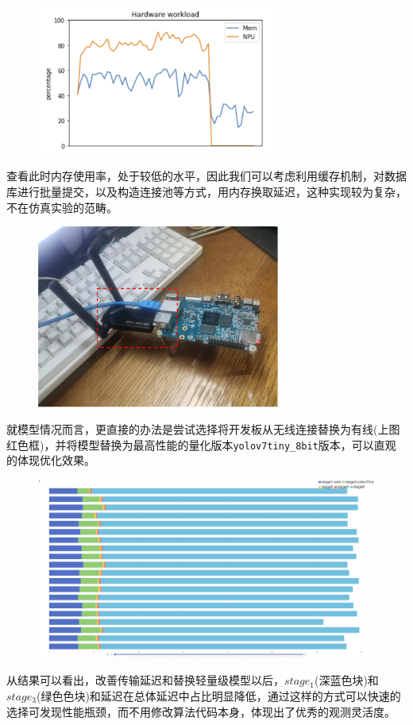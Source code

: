 \documentclass[master,anonymous]{shtthesis}
\begin{document}
\begin{figure}[H]
	\centering
	\includegraphics[width=8cm]{img/hw_c.png}
	\label{负载曲线}
\end{figure}
查看此时内存使用率，处于较低的水平，因此我们可以考虑利用缓存机制，对数据库进行批量提交，以及构造连接池等方式，用内存换取延迟，这种实现较为复杂，不在仿真实验的范畴。


\begin{figure}[H]
	\centering
	\includegraphics[width=8cm]{img/port.pdf}
	\label{网卡接入}
\end{figure}

就模型情况而言，更直接的办法是尝试选择将开发板从无线连接替换为有线(上图红色框)，并将模型替换为最高性能的量化版本\verb*|yolov7tiny_8bit|版本，可以直观的体现优化效果。
\begin{figure}[H]
	\centering
	\includegraphics[width=15cm]{img/echarts2.png}
	\label{优化后阶段延迟}
\end{figure}
从结果可以看出，改善传输延迟和替换轻量级模型以后，$stage_1$(深蓝色块)和$stage_3$(绿色色块)和延迟在总体延迟中占比明显降低，通过这样的方式可以快速的选择可发现性能瓶颈，而不用修改算法代码本身，体现出了优秀的观测灵活度。
\end{document}

